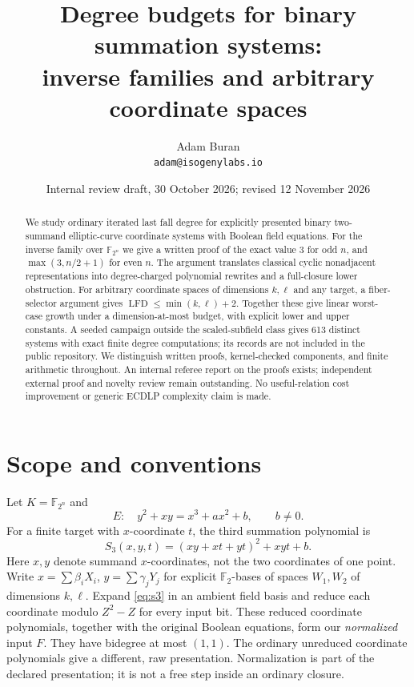 \documentclass[11pt]{article}
\title{Degree budgets for binary summation systems:\\inverse families and arbitrary coordinate spaces}
\author{Adam Buran\\ \texttt{adam@isogenylabs.io}}
\date{Internal review draft, 30 October 2026; revised 12 November 2026}
\theoremstyle{remark}\newtheorem{remark}[theorem]{Remark}
\newcommand{\F}{\mathbb F}
\newcommand{\lfd}{\operatorname{LFD}}
\begin{document}
\maketitle
\begin{abstract}
We study ordinary iterated last fall degree for explicitly presented binary
two-summand elliptic-curve coordinate systems with Boolean field equations.
For the inverse family over $\F_{2^n}$ we give a written proof of the exact value $3$ for odd $n$, and $\max(3,n/2+1)$ for even $n$. The argument translates
classical cyclic nonadjacent representations into degree-charged polynomial
rewrites and a full-closure lower obstruction. For arbitrary coordinate
spaces of dimensions $k,\ell$ and any target, a fiber-selector argument gives
$\lfd\leq\min(k,\ell)+2$. Together these give linear worst-case growth under
a dimension-at-most budget, with explicit lower and upper constants.
A seeded campaign outside the scaled-subfield class gives 613 distinct systems with exact finite degree computations; its records are not included in the public repository. We distinguish written
proofs, kernel-checked components, and finite arithmetic throughout.
An internal referee report on the proofs exists; independent external proof and novelty review remain outstanding. No useful-relation
cost improvement or generic ECDLP complexity claim is made.
\end{abstract}

\section{Scope and conventions}
Let $K=\F_{2^n}$ and
\[
 E:\quad y^2+xy=x^3+ax^2+b,\qquad b\ne0.
\]
For a finite target with $x$-coordinate $t$, the third summation polynomial is
\begin{equation}\label{eq:s3}
 S_3(x,y,t)=(xy+xt+yt)^2+xyt+b.
\end{equation}
Here $x,y$ denote summand $x$-coordinates, not the two coordinates of one
point. Write $x=\sum\beta_iX_i$, $y=\sum\gamma_jY_j$ for explicit
$\F_2$-bases of spaces $W_1,W_2$ of dimensions $k,\ell$. Expand
\eqref{eq:s3} in an ambient field basis and reduce each coordinate modulo
$Z^2-Z$ for every input bit. These reduced coordinate polynomials, together
with the original Boolean equations, form our \emph{normalized} input $F$.
They have bidegree at most $(1,1)$. The ordinary unreduced coordinate
polynomials give a different, raw presentation. Normalization is part of
the declared presentation; it is not a free step inside an ordinary closure.
\end{document}
